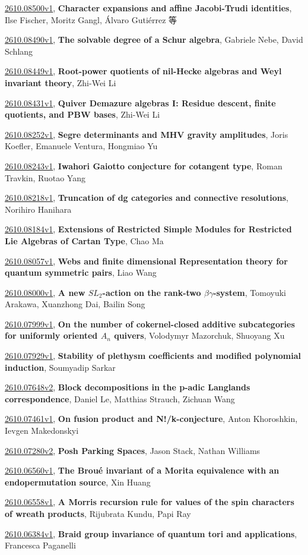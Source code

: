 \documentclass[9pt, a4paper]{article}
\theoremstyle{plain}
\theoremstyle{definition}
\theoremstyle{remark}
\newcommand{\arxiv}[3]{\href{https://arxiv.org/abs/#1}{#1}, \textbf{\textcolor{arxivblue}{#2}}, #3}
\begin{document}
\arxiv{2610.08500v1}{Character expansions and affine Jacobi-Trudi identities}{Ilse Fischer, Moritz Gangl, Álvaro Gutiérrez 等}

\arxiv{2610.08490v1}{The solvable degree of a Schur algebra}{Gabriele Nebe, David Schlang}

\arxiv{2610.08449v1}{Root-power quotients of nil-Hecke algebras and Weyl invariant theory}{Zhi-Wei Li}

\arxiv{2610.08431v1}{Quiver Demazure algebras I: Residue descent, finite quotients, and PBW bases}{Zhi-Wei Li}

\arxiv{2610.08252v1}{Segre determinants and MHV gravity amplitudes}{Joris Koefler, Emanuele Ventura, Hongmiao Yu}

\arxiv{2610.08243v1}{Iwahori Gaiotto conjecture for cotangent type}{Roman Travkin, Ruotao Yang}

\arxiv{2610.08218v1}{Truncation of dg categories and connective resolutions}{Norihiro Hanihara}

\arxiv{2610.08184v1}{Extensions of Restricted Simple Modules for Restricted Lie Algebras of Cartan Type}{Chao Ma}

\arxiv{2610.08057v1}{Webs and finite dimensional Representation theory for quantum symmetric pairs}{Liao Wang}

\arxiv{2610.08000v1}{A new $SL_2$-action on the rank-two $βγ$-system}{Tomoyuki Arakawa, Xuanzhong Dai, Bailin Song}

\arxiv{2610.07999v1}{On the number of cokernel-closed additive subcategories for uniformly oriented $A_n$ quivers}{Volodymyr Mazorchuk, Shuoyang Xu}

\arxiv{2610.07929v1}{Stability of plethysm coefficients and modified polynomial induction}{Soumyadip Sarkar}

\arxiv{2610.07648v2}{Block decompositions in the p-adic Langlands correspondence}{Daniel Le, Matthias Strauch, Zichuan Wang}

\arxiv{2610.07461v1}{On fusion product and N!/k-conjecture}{Anton Khoroshkin, Ievgen Makedonskyi}

\arxiv{2610.07280v2}{Posh Parking Spaces}{Jason Stack, Nathan Williams}

\arxiv{2610.06560v1}{The Broué invariant of a Morita equivalence with an endopermutation source}{Xin Huang}

\arxiv{2610.06558v1}{A Morris recursion rule for values of the spin characters of wreath products}{Rijubrata Kundu, Papi Ray}

\arxiv{2610.06384v1}{Braid group invariance of quantum tori and applications}{Francesca Paganelli}
\end{document}
